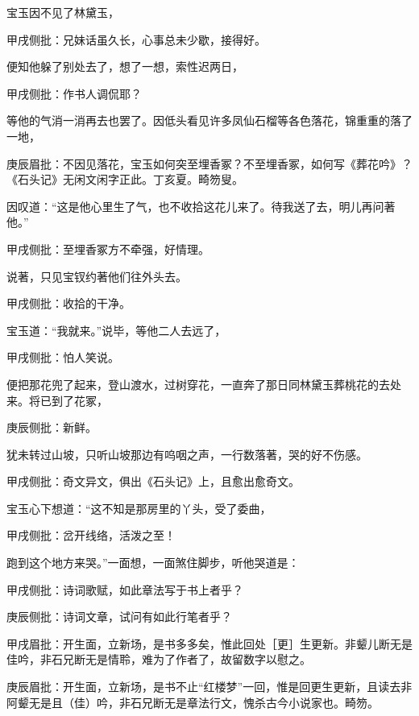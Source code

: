 \begin{parag}
    宝玉因不见了林黛玉，\begin{note}甲戌侧批：兄妹话虽久长，心事总未少歇，接得好。\end{note}便知他躲了别处去了，想了一想，索性迟两日，\begin{note}甲戌侧批：作书人调侃耶？\end{note}等他的气消一消再去也罢了。因低头看见许多凤仙石榴等各色落花，锦重重的落了一地，\begin{note}庚辰眉批：不因见落花，宝玉如何突至埋香冢？不至埋香冢，如何写《葬花吟》？《石头记》无闲文闲字正此。丁亥夏。畸笏叟。\end{note}因叹道：“这是他心里生了气，也不收拾这花儿来了。待我送了去，明儿再问著他。”\begin{note}甲戌侧批：至埋香冢方不牵强，好情理。\end{note}说著，只见宝钗约著他们往外头去。\begin{note}甲戌侧批：收拾的干净。\end{note}宝玉道：“我就来。”说毕，等他二人去远了，\begin{note}甲戌侧批：怕人笑说。\end{note}便把那花兜了起来，登山渡水，过树穿花，一直奔了那日同林黛玉葬桃花的去处来。将已到了花冢，\begin{note}庚辰侧批：新鲜。\end{note}犹未转过山坡，只听山坡那边有呜咽之声，一行数落著，哭的好不伤感。\begin{note}甲戌侧批：奇文异文，俱出《石头记》上，且愈出愈奇文。\end{note}宝玉心下想道：“这不知是那房里的丫头，受了委曲，\begin{note}甲戌侧批：岔开线络，活泼之至！\end{note}跑到这个地方来哭。”一面想，一面煞住脚步，听他哭道是：\begin{note}甲戌侧批：诗词歌赋，如此章法写于书上者乎？\end{note}\begin{note}庚辰侧批：诗词文章，试问有如此行笔者乎？\end{note}\begin{note}甲戌眉批：开生面，立新场，是书多多矣，惟此回处［更］生更新。非颦儿断无是佳吟，非石兄断无是情聆，难为了作者了，故留数字以慰之。\end{note}\begin{note}庚辰眉批：开生面，立新场，是书不止“红楼梦”一回，惟是回更生更新，且读去非阿颦无是且（佳）吟，非石兄断无是章法行文，愧杀古今小说家也。畸笏。\end{note}
\end{parag}
